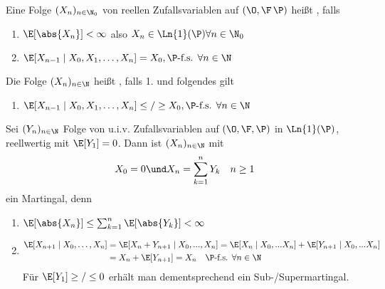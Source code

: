\begin{definition}
	Eine Folge $(X_n)_{n \in \N_0}$ von reellen Zufallsvariablen auf $(\O,\F\,\P)$ heißt , falls
	\begin{enumerate}
		\item $\E[\abs{X_n}] < \infty$ also $X_n \in \Ln{1}(\P)\forall n \in \N_0$
		\item $\E[X_{n-1} \mid X_0, X_1, \dots, X_n] = X_0, \P\text{-f.s. }\forall n \in \N$
	\end{enumerate}
	Die Folge $(X_n)_{n\in \N}$ heißt , falls 1. und folgendes gilt
	\begin{enumerate}
		\item $\E[X_{n-1} \mid X_0, X_1, \dots, X_n] \le /\ge X_0, \P\text{-f.s. }\forall n \in \N$
	\end{enumerate} 
\end{definition}
\begin{example}
	Sei $(Y_n)_{n\in \N}$ Folge von u.i.v. Zufallsvariablen auf $(\O,\F,\P)$ in $\Ln{1}(\P)$, reellwertig mit $\E[Y_1] = 0$. Dann ist $(X_n)_{n\in \N}$ mit 
	\begin{align*}
		X_0 = 0 \und X_n = \sum_{k=1}^n Y_k \quad n \ge 1
	\end{align*}
	ein Martingal, denn
	\begin{enumerate}
		\item $\E[\abs{X_n}] \le \sum_{k=1}^n \E[\abs{Y_k}] < \infty$
		\item 
		\begin{align*}
			\E[X_{n+1}\mid X_0, \dots, X_n] &= \E[X_n + Y_{n+1} \mid X_0 , ... , X_n] = \E[X_n \mid X_0, ... X_n] + \E[Y_{n+1} \mid X_0, ... X_n]\\
			&= X_n + \E[Y_{n+1}] = X_n \quad \P\text{-f.s. } \forall n \in \N
		\end{align*}
		Für $\E[Y_1] \ge / \le 0$ erhält man dementsprechend ein Sub-/Supermartingal.
	\end{enumerate}
\end{example}
